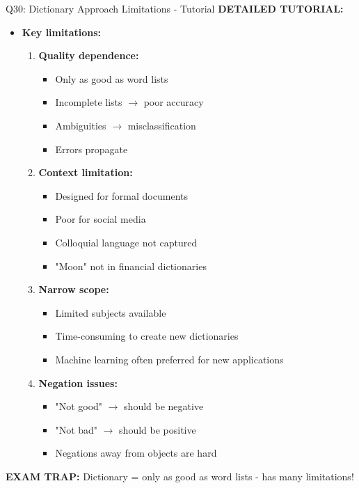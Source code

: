 \documentclass[8pt]{beamer}
\begin{document}
\begin{frame}{Q30: Dictionary Approach Limitations - Tutorial}
		\vspace{0.1cm}
		\textbf{DETAILED TUTORIAL:}
		\begin{itemize}
			\item \textbf{Key limitations:}
			\begin{enumerate}
				\item \textbf{Quality dependence:}
				\begin{itemize}
					\item Only as good as word lists
					\item Incomplete lists $\rightarrow$ poor accuracy
					\item Ambiguities $\rightarrow$ misclassification
					\item Errors propagate
				\end{itemize}
				\item \textbf{Context limitation:}
				\begin{itemize}
					\item Designed for formal documents
					\item Poor for social media
					\item Colloquial language not captured
					\item "Moon" not in financial dictionaries
				\end{itemize}
				\item \textbf{Narrow scope:}
				\begin{itemize}
					\item Limited subjects available
					\item Time-consuming to create new dictionaries
					\item Machine learning often preferred for new applications
				\end{itemize}
				\item \textbf{Negation issues:}
				\begin{itemize}
					\item "Not good" $\rightarrow$ should be negative
					\item "Not bad" $\rightarrow$ should be positive
					\item Negations away from objects are hard
				\end{itemize}
			\end{enumerate}
		\end{itemize}
		
		\textcolor{myred}{\textbf{EXAM TRAP:}} Dictionary = \textcolor{myblue}{only as good as word lists} - has many limitations!
	\end{frame}
	
\end{document}
